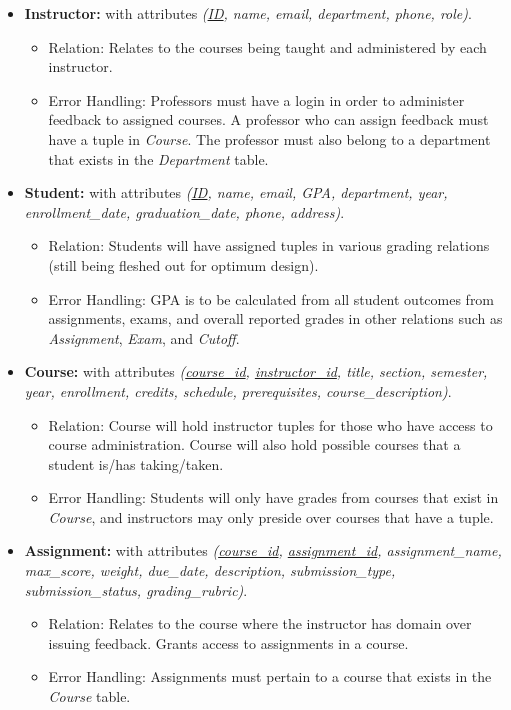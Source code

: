 \documentclass[12pt]{article}
\begin{document}
\begin{itemize}
    \item \textbf{Instructor:} with attributes \textit{(\underline{ID}, name, email, department, phone, role)}.
    \begin{itemize}
        \item Relation: Relates to the courses being taught and administered by each instructor.
        \item Error Handling: Professors must have a login in order to administer feedback to assigned courses. A professor who can assign feedback must have a tuple in \textit{Course}. The professor must also belong to a department that exists in the \textit{Department} table.
    \end{itemize}

    \item \textbf{Student:} with attributes \textit{(\underline{ID}, name, email, GPA, department, year, enrollment\_date, graduation\_date, phone, address)}.
    \begin{itemize}
        \item Relation: Students will have assigned tuples in various grading relations (still being fleshed out for optimum design).
        \item Error Handling: GPA is to be calculated from all student outcomes from assignments, exams, and overall reported grades in other relations such as \textit{Assignment}, \textit{Exam}, and \textit{Cutoff}.
    \end{itemize}

    \item \textbf{Course:} with attributes \textit{(\underline{course\_id}, \underline{instructor\_id}, title, section, semester, year, enrollment, credits, schedule, prerequisites, course\_description)}.
    \begin{itemize}
        \item Relation: Course will hold instructor tuples for those who have access to course administration. Course will also hold possible courses that a student is/has taking/taken.
        \item Error Handling: Students will only have grades from courses that exist in \textit{Course}, and instructors may only preside over courses that have a tuple.
    \end{itemize}

    \item \textbf{Assignment:} with attributes \textit{(\underline{course\_id}, \underline{assignment\_id}, assignment\_name, max\_score, weight, due\_date, description, submission\_type, submission\_status, grading\_rubric)}.
    \begin{itemize}
        \item Relation: Relates to the course where the instructor has domain over issuing feedback. Grants access to assignments in a course.
        \item Error Handling: Assignments must pertain to a course that exists in the \textit{Course} table.
    \end{itemize}


\end{itemize}
\end{document}
